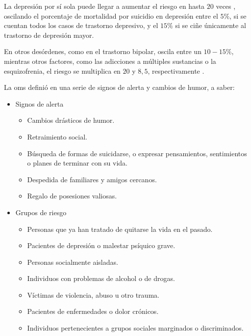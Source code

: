         La depresión por sí sola puede llegar a aumentar el riesgo en hasta $20$ veces \cite{gonzalez_depresion_2020}, oscilando el porcentaje de mortalidad por suicidio en depresión entre el $5\%$, si se cuentan todos los casos de trastorno depresivo, y el $15\%$ si se ciñe únicamente al trastorno de depresión mayor. 
        
        En otros desórdenes, como en el trastorno bipolar, oscila entre un $10-15\%$, mientras otros factores, como las adicciones a múltiples sustancias o la esquizofrenia, el riesgo se multiplica en $20$ y $8,5$, respectivamente \cite{gonzalez_depresion_2020}. 

        La \gls{oms} definió en \cite{oms_suicidio_2023} una serie de signos de alerta y cambios de humor, a saber:
        \begin{itemize}
            \item Signos de alerta
                \begin{itemize}
                    \item Cambios drásticos de humor.
                    \item Retraimiento social.
                    \item Búsqueda de formas de suicidarse, o expresar pensamientos, sentimientos o planes de terminar con su vida.
                    \item Despedida de familiares y amigos cercanos.
                    \item Regalo de posesiones valiosas.
                \end{itemize}
            \item Grupos de riesgo
                \begin{itemize}
                    \item Personas que ya han tratado de quitarse la vida en el pasado.
                    \item Pacientes de depresión o malestar psíquico grave.
                    \item Personas socialmente aisladas.
                    \item Individuos con problemas de alcohol o de drogas.
                    \item Víctimas de violencia, abuso u otro trauma.
                    \item Pacientes de enfermedades o dolor crónicos.
                    \item Individuos pertenecientes a grupos sociales marginados o discriminados.
                \end{itemize}
        \end{itemize}
       
